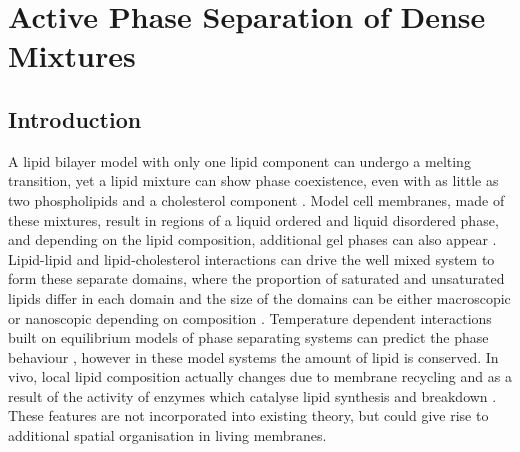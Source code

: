 

\chapter{\label{ch:2-draft}Active Phase Separation of Dense Mixtures}

\minitoc
\newpage

\section{Introduction}

A lipid bilayer model with only one lipid component can undergo a melting transition, yet a lipid mixture can show phase coexistence, even with as little as two phospholipids and a cholesterol component \cite{elson_phase_2010}. Model cell membranes, made of these mixtures, result in regions of a liquid ordered and liquid disordered phase, and depending on the lipid composition, additional gel phases can also appear \cite{sych_how_2021, aufderhorst-roberts_three-phase_2017}. Lipid-lipid and lipid-cholesterol interactions can drive the well mixed system to form these separate domains, where the proportion of saturated and unsaturated lipids differ in each domain and the size of the domains can be either macroscopic or nanoscopic depending on composition \cite{feigenson_phase_2009}. Temperature dependent interactions built on equilibrium models of phase separating systems can predict the phase behaviour \cite{wolff_thermodynamic_2011}, however in these model systems the amount of lipid is conserved. In vivo, local lipid composition actually changes due to membrane recycling and as a result of the activity of enzymes which catalyse lipid synthesis and breakdown \cite{feigenson_phase_2009}. These features are not incorporated into existing theory, but could give rise to additional spatial organisation in living membranes.

